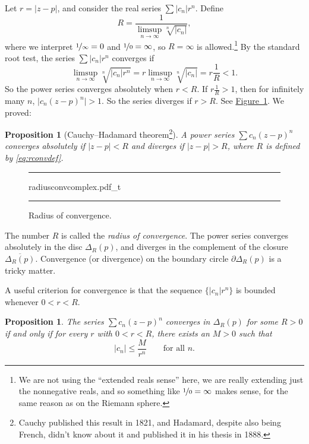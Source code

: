 \documentclass[12pt,openany]{book}
\newcommand{\sabs}[1]{\lvert {#1} \rvert}
\newcommand{\myindex}[1]{#1\index{#1}}
\newcommand{\myquote}[1]{``#1''}
\theoremstyle{plain}
\newtheorem{prop}[thm]{Proposition}
\theoremstyle{remark}
\theoremstyle{definition}
\newenvironment{myfig}{%
\begin{figure}[h!t]
\noindent\rule{\textwidth}{0.5pt}\vspace{12pt}\par\centering}%
{\par\noindent\rule{\textwidth}{0.5pt}
\end{figure}}
\theoremstyle{exercise}
\theoremstyle{example}
\newcommand{\figureref}[1]{\hyperref[#1]{Figure~\ref*{#1}}}
\begin{document}
Let $r = \sabs{z-p}$, and consider the real series $\sum \sabs{c_n} r^n$.  Define
\begin{equation} \label{eq:rconvdef}
R = \frac{1}{\limsup\limits_{n \to \infty} \sqrt[n]{\sabs{c_n}}} ,
\end{equation}
where we interpret $\nicefrac{1}{\infty} = 0$ and $\nicefrac{1}{0} = \infty$,
so $R=\infty$ is allowed.\footnote{%
We are not using the \myquote{extended reals sense} here,
we are really extending just the nonnegative reals, and so
something like $\nicefrac{1}{0}=\infty$ makes sense, for the same
reason as on the Riemann sphere.}
By the standard root test, the series $\sum \sabs{c_n} r^n$
converges if
\begin{equation*}
\limsup_{n \to \infty} \sqrt[n]{\sabs{c_n} r^n} = 
r \limsup_{n \to \infty} \sqrt[n]{\sabs{c_n}} = r \frac{1}{R} < 1 .
\end{equation*}
So the power series converges absolutely when $r < R$.
If $r \frac{1}{R} > 1$, then for infinitely many $n$,
$\sabs{c_n {(z-p)}^n} > 1$. So the series
diverges if $r > R$.
See \figureref{fig:radiusconvcomplex}.
We proved:

\begin{prop}[Cauchy--Hadamard theorem\footnote{%
Cauchy published this result in 1821, and Hadamard, despite also being
French, didn't know about it and published it in his thesis in 1888.}]
A power series $\sum c_n {(z-p)}^n$ converges absolutely if
$\sabs{z-p} < R$ and diverges if
$\sabs{z-p} > R$, where $R$ is defined by \eqref{eq:rconvdef}.
\end{prop}

\begin{myfig}
{radiusconvcomplex.pdf_t}
\caption{Radius of convergence.\label{fig:radiusconvcomplex}}
\end{myfig}

The number $R$ is called the \emph{\myindex{radius of convergence}}.
The power series converges absolutely
in the disc $\Delta_R(p)$, and diverges
in the complement of the closure $\overline{\Delta_R(p)}$.
Convergence (or divergence) on the boundary circle $\partial \Delta_R(p)$
is a tricky matter.

A useful criterion for convergence is that the sequence
$\bigl\{ \sabs{c_n} r^n \bigr\}$ is
bounded whenever $0 < r < R$.

\begin{prop} \label{prop:cnrnbounded}
The series $\sum c_n {(z-p)}^n$ converges in $\Delta_{R}(p)$ for some
$R > 0$ if and only if
for every $r$ with
$0 < r < R$, there exists an $M > 0$ such that
\begin{equation*}
\sabs{c_n} \leq \frac{M}{r^n} \qquad \text{for all } n .
\end{equation*}
\end{prop}
\end{document}
